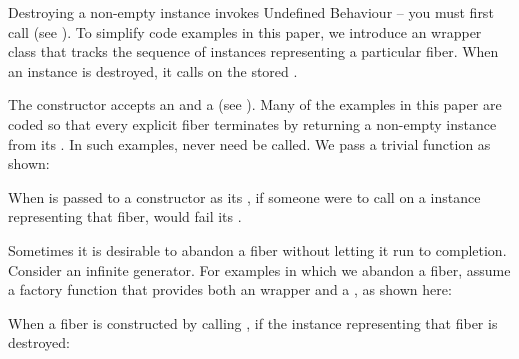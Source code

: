 \newpage
{}\label{launch}\label{appendixa}

Destroying a non-empty \fiber instance invokes Undefined Behaviour -- you must
first call \anycancel (see ). To simplify code examples in this paper, we introduce
an  wrapper class that tracks the sequence of \fiber instances
representing a particular fiber. When an  instance is
destroyed, it calls \cancel on the stored \fiber.


The \fiber constructor accepts an \entryfn and a \cancelfn (see
). Many of the examples in this paper are coded so that
every explicit fiber terminates by returning a non-empty \fiber instance from
its \entryfn. In such examples, \cancel never need be called. We pass a
trivial  function as shown:


When  is passed to a \fiber constructor as its \cancelfn,
if someone were to call \cancel on a \fiber instance representing that fiber,
 would fail its .

Sometimes it is desirable to abandon a fiber without letting it run to
completion. Consider an infinite generator. For examples in which we abandon a
fiber, assume a  factory function that provides both an \entryfn
wrapper and a \cancelfn, as shown here:


When a fiber is constructed by calling , if the 
instance representing that fiber is destroyed:

